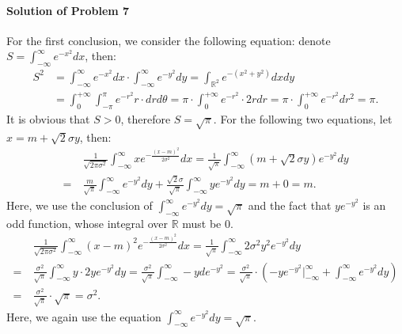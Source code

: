 \documentclass{article}
\begin{document}
\paragraph{Solution of Problem 7} For the first conclusion, we consider the following equation: denote $S=\int_{-\infty}^{\infty}e^{-x^2}dx$, then:
\begin{equation*}
\begin{aligned}
S^2&=\int_{-\infty}^{\infty}e^{-x^2}dx \cdot\int_{-\infty}^{\infty}e^{-y^2}dy = \int_{\mathbb{R}^2}e^{-(x^2+y^2)}dxdy\\
& = \int_{0}^{+\infty}\int_{-\pi}^{\pi} e^{-r^2}r\cdot drd\theta = \pi\cdot \int_{0}^{+\infty}e^{-r^2}\cdot 2rdr = \pi\cdot \int_{0}^{+\infty}e^{-r^2}dr^2 = \pi.
\end{aligned}    
\end{equation*}
It is obvious that $S>0$, therefore $S=\sqrt{\pi}$. For the following two equations, let $x=m+\sqrt{2}\sigma y$, then:
\begin{equation*}
\begin{aligned}
&\frac{1}{\sqrt{2\pi\sigma^2}}\int_{-\infty}^{\infty}xe^{-\frac{(x-m)^2}{2\sigma^2}}dx = \frac{1}{\sqrt{\pi}}\int_{-\infty}^{\infty}(m+\sqrt{2}\sigma y)e^{-y^2}dy\\
=~&\frac{m}{\sqrt{\pi}}\int_{-\infty}^{\infty}e^{-y^2}dy+\frac{\sqrt{2}\sigma}{\sqrt{\pi}}\int_{-\infty}^{\infty}ye^{-y^2}dy = m+0=m.
\end{aligned}    
\end{equation*}
Here, we use the conclusion of $\int_{-\infty}^{\infty}e^{-y^2}dy=\sqrt{\pi}$ and the fact that $ye^{-y^2}$ is an odd function, whose integral over $\mathbb{R}$ must be 0. 
\begin{equation*}
\begin{aligned}
&\frac{1}{\sqrt{2\pi\sigma^2}}\int_{-\infty}^{\infty}(x-m)^2e^{-\frac{(x-m)^2}{2\sigma^2}}dx = \frac{1}{\sqrt{\pi}}\int_{-\infty}^{\infty}2\sigma^2 y^2 e^{-y^2}dy\\
=~&\frac{\sigma^2}{\sqrt{\pi}}\int_{-\infty}^{\infty}y\cdot 2ye^{-y^2}dy = \frac{\sigma^2}{\sqrt{\pi}}\int_{-\infty}^{\infty}-y de^{-y^2} = \frac{\sigma^2}{\sqrt{\pi}}\cdot \left(-ye^{-y^2}\Bigg|_{-\infty}^{\infty}+\int_{-\infty}^{\infty}e^{-y^2}dy\right)\\
=~&\frac{\sigma^2}{\sqrt{\pi}}\cdot\sqrt{\pi}=\sigma^2.
\end{aligned}    
\end{equation*}
Here, we again use the equation $\int_{-\infty}^{\infty}e^{-y^2}dy=\sqrt{\pi}$.
\end{document}
